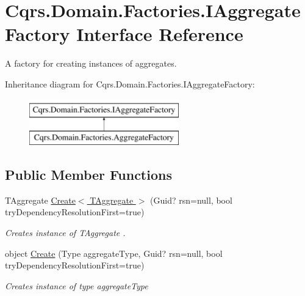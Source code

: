 \hypertarget{interfaceCqrs_1_1Domain_1_1Factories_1_1IAggregateFactory}{}\section{Cqrs.\+Domain.\+Factories.\+I\+Aggregate\+Factory Interface Reference}
\label{interfaceCqrs_1_1Domain_1_1Factories_1_1IAggregateFactory}


A factory for creating instances of aggregates.  


Inheritance diagram for Cqrs.\+Domain.\+Factories.\+I\+Aggregate\+Factory\+:\begin{figure}[H]
\begin{center}
\leavevmode
\includegraphics[height=2.000000cm]{interfaceCqrs_1_1Domain_1_1Factories_1_1IAggregateFactory}
\end{center}
\end{figure}
\subsection*{Public Member Functions}
\begin{DoxyCompactItemize}
\item 
T\+Aggregate \hyperlink{interfaceCqrs_1_1Domain_1_1Factories_1_1IAggregateFactory_a3dcbf8900e0d536da241e2e94f74cdd5_a3dcbf8900e0d536da241e2e94f74cdd5}{Create$<$ T\+Aggregate $>$} (Guid? rsn=null, bool try\+Dependency\+Resolution\+First=true)
\begin{DoxyCompactList}\small\item\em Creates instance of {\itshape T\+Aggregate} . \end{DoxyCompactList}\item 
object \hyperlink{interfaceCqrs_1_1Domain_1_1Factories_1_1IAggregateFactory_ade388f0dfa9c42964392159a4f97fb1e_ade388f0dfa9c42964392159a4f97fb1e}{Create} (Type aggregate\+Type, Guid? rsn=null, bool try\+Dependency\+Resolution\+First=true)
\begin{DoxyCompactList}\small\item\em Creates instance of type {\itshape aggregate\+Type}  \end{DoxyCompactList}\end{DoxyCompactItemize}


